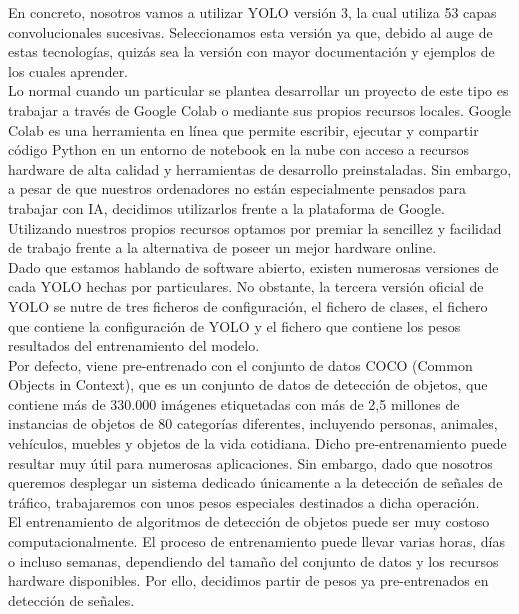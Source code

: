 En concreto, nosotros vamos a utilizar YOLO versión 3, la cual utiliza 53 capas convolucionales sucesivas. Seleccionamos esta versión ya que, debido al auge de estas tecnologías, quizás sea la versión con mayor documentación y ejemplos de los cuales aprender.\\

Lo normal cuando un particular se plantea desarrollar un proyecto de este tipo es trabajar a través de Google Colab o mediante sus propios recursos locales. Google Colab es una herramienta en línea que permite escribir, ejecutar y compartir código Python en un entorno de notebook en la nube con acceso a recursos hardware de alta calidad y herramientas de desarrollo preinstaladas. Sin embargo, a pesar de que nuestros ordenadores no están especialmente pensados para trabajar con IA, decidimos utilizarlos frente a la plataforma de Google. Utilizando nuestros propios recursos optamos por premiar la sencillez y facilidad de trabajo frente a la alternativa de poseer un mejor hardware online.\\

Dado que estamos hablando de software abierto, existen numerosas versiones de cada YOLO hechas por particulares. No obstante, la tercera versión oficial de YOLO se nutre de tres ficheros de configuración, el fichero de clases, el fichero que contiene la configuración de YOLO y el fichero que contiene los pesos resultados del entrenamiento del modelo.\\

Por defecto, viene pre-entrenado con el conjunto de datos COCO (Common Objects in Context), que es un conjunto de datos de detección de objetos, que contiene más de 330.000 imágenes etiquetadas con más de 2,5 millones de instancias de objetos de 80 categorías diferentes, incluyendo personas, animales, vehículos, muebles y objetos de la vida cotidiana. Dicho pre-entrenamiento puede resultar muy útil para numerosas aplicaciones. Sin embargo, dado que nosotros queremos desplegar un sistema dedicado únicamente a la detección de señales de tráfico, trabajaremos con unos pesos especiales destinados a dicha operación.\\

El entrenamiento de algoritmos de detección de objetos puede ser muy costoso computacionalmente. El proceso de entrenamiento puede llevar varias horas, días o incluso semanas, dependiendo del tamaño del conjunto de datos y los recursos hardware disponibles. Por ello, decidimos partir de pesos ya pre-entrenados en detección de señales.\\

